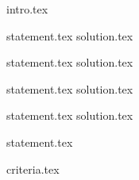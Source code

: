 {intro.tex}

{statement.tex}
{solution.tex}

{statement.tex}
{solution.tex}

{statement.tex}
{solution.tex}

{statement.tex}
{solution.tex}


{statement.tex}

{criteria.tex}